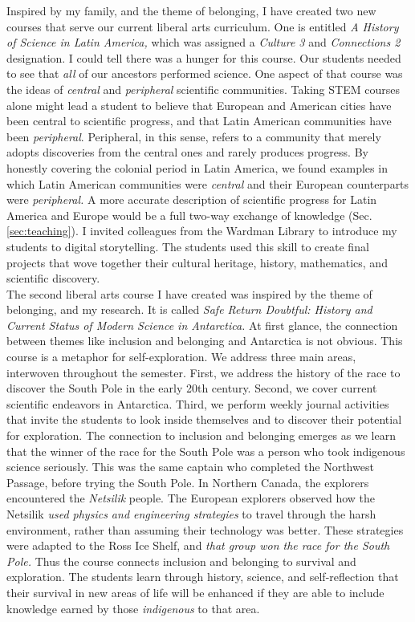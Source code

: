 \documentclass[../../main.tex]{subfiles}
\begin{document}
Inspired by my family, and the theme of belonging, I have created two new courses that serve our current liberal arts curriculum.  One is entitled \textit{A History of Science in Latin America,} which was assigned a \textit{Culture 3} and \textit{Connections 2} designation.  I could tell there was a hunger for this course.  Our students needed to see that \textit{all} of our ancestors performed science.  One aspect of that course was the ideas of \textit{central} and \textit{peripheral} scientific communities.  Taking STEM courses alone might lead a student to believe that European and American cities have been central to scientific progress, and that Latin American communities have been \textit{peripheral}.  Peripheral, in this sense, refers to a community that merely adopts discoveries from the central ones and rarely produces progress.  By honestly covering the colonial period in Latin America, we found examples in which Latin American communities were \textit{central} and their European counterparts were \textit{peripheral.}  A more accurate description of scientific progress for Latin America and Europe would be a full two-way exchange of knowledge (Sec. \ref{sec:teaching}).  I invited colleagues from the Wardman Library to introduce my students to digital storytelling.  The students used this skill to create final projects that wove together their cultural heritage, history, mathematics, and scientific discovery.
\\
\vspace{0.25cm}
The second liberal arts course I have created was inspired by the theme of belonging, and my research.  It is called \textit{Safe Return Doubtful: History and Current Status of Modern Science in Antarctica.}  At first glance, the connection between themes like inclusion and belonging and Antarctica is not obvious.  This course is a metaphor for self-exploration.  We address three main areas, interwoven throughout the semester.  First, we address the history of the race to discover the South Pole in the early 20th century.  Second, we cover current scientific endeavors in Antarctica.  Third, we perform weekly journal activities that invite the students to look inside themselves and to discover their potential for exploration.  The connection to inclusion and belonging emerges as we learn that the winner of the race for the South Pole was a person who took indigenous science seriously.  This was the same captain who completed the Northwest Passage, before trying the South Pole.  In Northern Canada, the explorers encountered the \textit{Netsilik} people.  The European explorers observed how the Netsilik \textit{used physics and engineering strategies} to travel through the harsh environment, rather than assuming their technology was better.  These strategies were adapted to the Ross Ice Shelf, and \textit{that group won the race for the South Pole.}  Thus the course connects inclusion and belonging to survival and exploration.  The students learn through history, science, and self-reflection that their survival in new areas of life will be enhanced if they are able to include knowledge earned by those \textit{indigenous} to that area.
\end{document}

